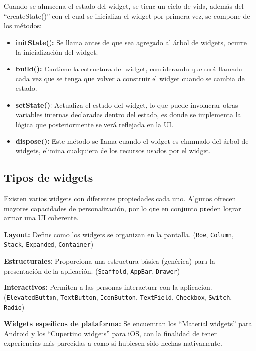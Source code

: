 Cuando se almacena el estado del widget, se tiene un ciclo de vida, además del “createState()” con el cual se inicializa el widget por primera vez, se compone de los métodos:

\begin{itemize}
  \item \textbf{initState():} Se llama antes de que sea agregado al árbol de widgets, ocurre la inicialización del widget.
  \item \textbf{build():} Contiene la estructura del widget, considerando que será llamado cada vez que se tenga que volver a construir el widget cuando se cambia de estado.
  \item \textbf{setState():} Actualiza el estado del widget, lo que puede involucrar otras variables internas declaradas dentro del estado, es donde se implementa la lógica que posteriormente se verá reflejada en la UI.
  \item \textbf{dispose():} Este método se llama cuando el widget es eliminado del árbol de widgets, elimina cualquiera de los recursos usados por el widget.
\end{itemize}

\subsection{Tipos de widgets}
Existen varios widgets con diferentes propiedades cada uno. Algunos ofrecen mayores capacidades de personalización, por lo que en conjunto pueden lograr armar una UI coherente. \parencite{Pandya2025}

\textbf{Layout:} Define como los widgets se organizan en la pantalla. (\lstinline{Row}, \lstinline{Column}, \lstinline{Stack}, \lstinline{Expanded}, \lstinline{Container})

\textbf{Estructurales:} Proporciona una estructura básica (genérica) para la presentación de la aplicación. (\lstinline{Scaffold}, \lstinline{AppBar}, \lstinline{Drawer})


\textbf{Interactivos:} Permiten a las personas interactuar con la aplicación. (\lstinline{ElevatedButton}, \lstinline{TextButton}, \lstinline{IconButton}, \lstinline{TextField}, \lstinline{Checkbox}, \lstinline{Switch}, \lstinline{Radio})


\textbf{Widgets espeíficos de plataforma:} Se encuentran los ``Material widgets'' para Android y los ``Cupertino widgets'' para iOS, con la finalidad de tener experiencias más parecidas a como si hubiesen sido hechas nativamente.


